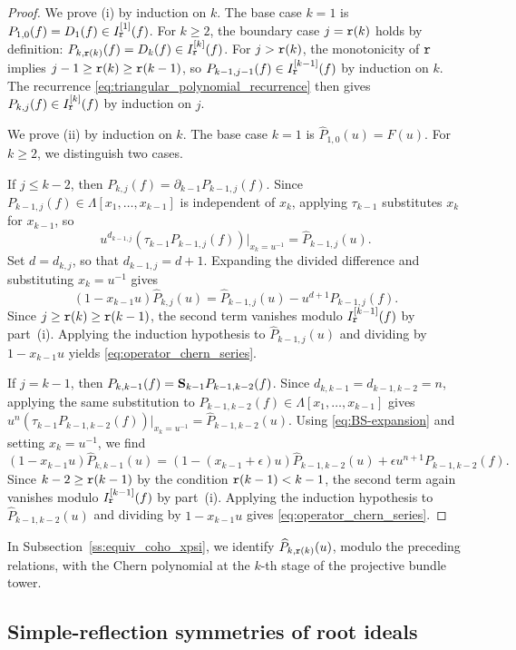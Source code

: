\begin{proof}
We prove (i) by induction on $k$. The base case $k=1$ is
$P_{1,0}(f)=D_1(f)\in I_{\mathtt r}^{[1]}(f)$.
For $k\geq 2$, the boundary case $j=\mathtt r(k)$ holds by definition:
$P_{k,\mathtt r(k)}(f)=D_k(f)\in I_{\mathtt r}^{[k]}(f)$.
For $j>\mathtt r(k)$, the monotonicity of $\mathtt r$ implies $j-1\geq\mathtt r(k)\geq\mathtt r(k-1)$,
so $P_{k-1,j-1}(f)\in I_{\mathtt r}^{[k-1]}(f)$ by induction on $k$.
The recurrence \eqref{eq:triangular_polynomial_recurrence} then gives
$P_{k,j}(f)\in I_{\mathtt r}^{[k]}(f)$ by induction on $j$.

We prove (ii) by induction on $k$. The base case $k=1$ is $\widehat P_{1,0}(u)=F(u)$.
For $k\geq 2$, we distinguish two cases.

If $j\leq k-2$, then $P_{k,j}(f)=\partial_{k-1}P_{k-1,j}(f)$.
Since $P_{k-1,j}(f)\in\Lambda[x_1,\dots,x_{k-1}]$ is independent of $x_k$, applying $\tau_{k-1}$ substitutes $x_k$ for $x_{k-1}$, so
\[
  u^{d_{k-1,j}}(\tau_{k-1}P_{k-1,j}(f))\big|_{x_k=u^{-1}}=\widehat P_{k-1,j}(u).
\]
Set $d=d_{k,j}$, so that $d_{k-1,j}=d+1$.
Expanding the divided difference and substituting $x_k=u^{-1}$ gives
\[
  (1-x_{k-1}u)\widehat P_{k,j}(u)
  =\widehat P_{k-1,j}(u)-u^{d+1}P_{k-1,j}(f).
\]
Since $j\geq\mathtt r(k)\geq\mathtt r(k-1)$, the second term vanishes modulo
$I_{\mathtt r}^{[k-1]}(f)$ by part~(i).
Applying the induction hypothesis to $\widehat P_{k-1,j}(u)$ and dividing by
$1-x_{k-1}u$ yields \eqref{eq:operator_chern_series}.

If $j=k-1$, then $P_{k,k-1}(f)=\mathbf S_{k-1}P_{k-1,k-2}(f)$.
Since $d_{k,k-1}=d_{k-1,k-2}=n$, applying the same substitution to
$P_{k-1,k-2}(f)\in\Lambda[x_1,\dots,x_{k-1}]$ gives
$u^n(\tau_{k-1}P_{k-1,k-2}(f))\big|_{x_k=u^{-1}}=\widehat P_{k-1,k-2}(u)$.
Using \eqref{eq:BS-expansion} and setting $x_k=u^{-1}$, we find
\[
  (1-x_{k-1}u)\widehat P_{k,k-1}(u)
  =(1-(x_{k-1}+\epsilon)u)\widehat P_{k-1,k-2}(u)
  +\epsilon u^{n+1}P_{k-1,k-2}(f).
\]
Since $k-2\geq\mathtt r(k-1)$ by the condition $\mathtt r(k-1)<k-1$, the second term
again vanishes modulo $I_{\mathtt r}^{[k-1]}(f)$ by part~(i).
Applying the induction hypothesis to $\widehat P_{k-1,k-2}(u)$ and dividing by
$1-x_{k-1}u$ gives \eqref{eq:operator_chern_series}.
\end{proof}

In Subsection~\ref{ss:equiv_coho_xpsi}, we identify $\widehat P_{k,\mathtt r(k)}(u)$,
modulo the preceding relations, with the Chern polynomial at the $k$-th stage of the projective bundle tower.

\subsection{Simple-reflection symmetries of root ideals}

